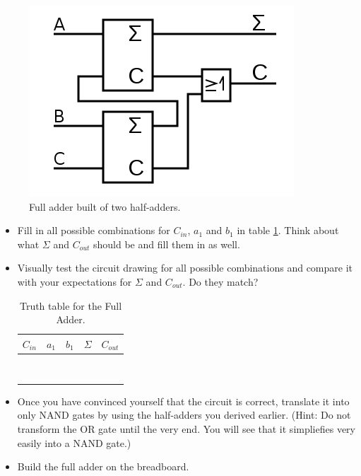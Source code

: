 \documentclass[10pt,a4paper]{article}
\begin{document}
\begin{figure}[h]
	\centering		  
	\includegraphics[scale=0.3]{full_adder.png}
	\caption{Full adder built of two half-adders.}
	\label{fig:full-adder}
\end{figure}
\begin{itemize}
	\item Fill in all possible combinations for $C_{in}$, $a_1$ and $b_1$ in table \ref{tab:full-adder-truth-table}. Think about what $\Sigma$ and $C_{out}$ should be and fill them in as well.
	\item Visually test the circuit drawing for all possible combinations and compare it with your expectations for $\Sigma$ and $C_{out}$. Do they match?
	
	\begin{table}[h]
		\centering
		\begin{tabular}{|c|c|c||c|c|}
			\hline
			$C_{in}$ & $a_1$ & $b_1$ & $\Sigma$ & $C_{out}$ \\ \hline
			&     &     &          &           \\ \hline
			&     &     &          &           \\ \hline
			&     &     &          &           \\ \hline
			&     &     &          &           \\ \hline
			&     &     &          &           \\ \hline
			&     &     &          &           \\ \hline
			&     &     &          &           \\ \hline
			&     &     &          &           \\ \hline
		\end{tabular}
		\caption{Truth table for the Full Adder.}
		\label{tab:full-adder-truth-table}
	\end{table}
	
	\item Once you have convinced yourself that the circuit is correct, translate it into only NAND gates by using the half-adders you derived earlier. (Hint: Do not transform the OR gate until the very end. You will see that it simpliefies very easily into a NAND gate.)
	\item Build the full adder on the breadboard.
\end{itemize}
\end{document}
